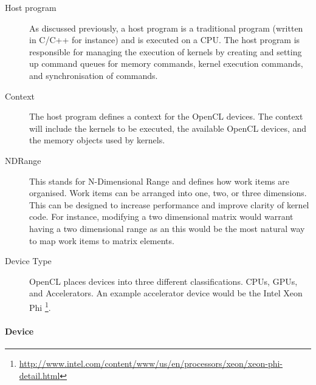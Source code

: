 \begin{description}

\item[Host program] As discussed previously, a host program is a traditional
program (written in C/C++ for instance) and is executed on a CPU. The host
program is responsible for managing the execution of kernels by creating and
setting up command queues for memory commands, kernel execution commands, and
synchronisation of commands.

\item[Context] The host program defines a context for the OpenCL devices. The
context will include the kernels to be executed, the available OpenCL devices,
and the memory objects used by kernels.

\item[NDRange] This stands for N-Dimensional Range and defines how work items
are organised. Work items can be arranged into one, two, or three dimensions.
This can be designed to increase performance and improve clarity of kernel code.
For instance, modifying a two dimensional matrix would warrant having a two
dimensional range as an this would be the most natural way to map work items to
matrix elements.

\item[Device Type] OpenCL places devices into three different classifications.
CPUs, GPUs, and Accelerators. An example accelerator device would be the Intel
Xeon Phi
\footnote{\url{http://www.intel.com/content/www/us/en/processors/xeon/xeon-phi-detail.html}}.

\end{description}

\paragraph{Device}

